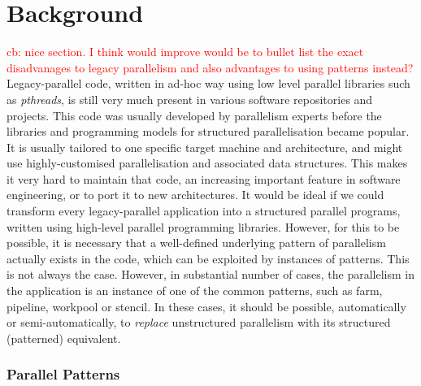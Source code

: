 \section{Background} \label{sec:background}
\textcolor{red}{cb: nice section. I think would improve would be to bullet list the exact disadvanages to legacy parallelism and also advantages to using patterns instead?}
Legacy-parallel code, written in ad-hoc way using low level parallel libraries such as \emph{pthreads}, is still very much present in various software repositories and projects. This code was usually developed by parallelism experts before the libraries and programming models for structured parallelisation became popular. It is usually tailored to one specific target machine and architecture, and might use highly-customised parallelisation and associated data structures. This makes it very hard to maintain that code, an increasing important feature in software engineering, or to port it to new architectures. It would be ideal if we could transform every legacy-parallel application into a structured parallel programs, written using high-level parallel programming libraries. However, for this to be possible, it is necessary that a well-defined underlying pattern of parallelism actually exists in the code, which can be exploited by instances of patterns. This is not always the case. However, in substantial number of cases, the parallelism in the application is an instance of one of the common patterns, such as farm, pipeline, workpool or stencil. In these cases, it should be possible, automatically or semi-automatically, to \emph{replace} unstructured parallelism with its structured (patterned) equivalent.   

\subsubsection*{Parallel Patterns}

